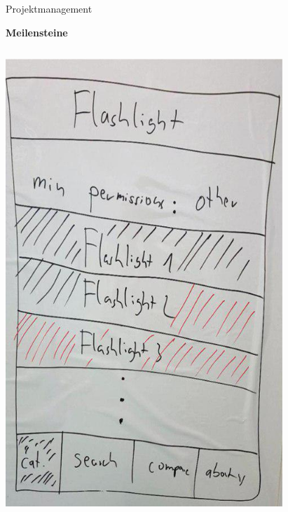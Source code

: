\documentclass[compress,t]{beamer}
\begin{document}
\begin{frame}{Projektmanagement}

    \textbf{Meilensteine}

    \begin{columns}[t]
        \centering
        \includegraphics[width=0.8\textwidth]{img/1.jpg}\\
        \centering

\end{columns}
\end{frame}
\end{document}
